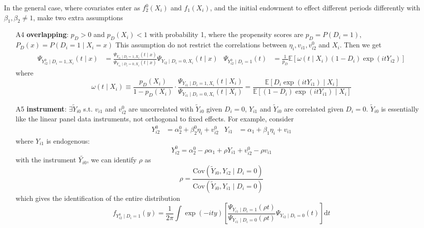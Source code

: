 \documentclass[twoside]{article}
\begin{document}
In the general case, where covariates enter as $f_2^0(X_i)$ and $f_1(X_i)$, and the initial endowment to effect different periods differently with $\beta_1,\beta_2\neq 1$, \citet{bonhomme2011recover} make two extra assumptions
\begin{itemize}
    \item[A4] \textbf{overlapping}: $p_D>0$ and $p_D(X_i)<1$ with probability 1, where the propensity scores are $p_D=P(D_i=1)$, $P_D(x)=P\left(D_i=1\mid X_i=x\right)$
        This assumption do not restrict the correlations between $\eta_i,v_{i1},v^0_{i2}$ and $X_i$. Then we get 
    \begin{align*}
        \Psi_{Y^0_{i2}\mid D_i=1,X_i}(t\mid x) &= \frac{\Psi_{Y_{i1}\mid D_i=1,X_i}(t\mid x)}{ \Psi_{Y_{i1}\mid D_i=0,X_i}(t\mid x) } \Psi_{Y_{i2}\mid D_i=0,X_i}(t\mid x) & \Psi_{Y^0_{i2}\mid D_i=1}(t) &= \frac{1}{p_D}\mathbb{E}\left[ \omega (t\mid X_i)(1-D_i)\exp(itY_{i2}) \right]
    \end{align*}
    where
    \begin{equation*}
        \omega(t\mid X_i) \equiv \frac{p_D(X_i)}{1-p_D(X_i)} \cdot \frac{\Psi_{Y_{i1}\mid D_i=1,X_i}(t\mid X_i)}{\Psi_{Y_{i1}\mid D_i=0,X_i}(t\mid X_i)} = \frac{\mathbb{E} \left[D_i\exp(itY_{i1})\mid X_i\right]}{ \mathbb{E}\left[(1-D_i)\exp(itY_{i1})\mid X_i\right] }
    \end{equation*}
    \item[A5] \textbf{instrument}: $\exists \tilde{Y}_{i0}$ s.t. $v_{i1}$ and $v_{i2}^0$ are uncorrelated with $\tilde{Y}_{i0}$ given $D_i=0$, $Y_{i1}$ and $\tilde{Y}_{i0}$ are correlated given $D_i=0$. $\tilde{Y}_{i0}$ is essentially like the linear panel data instruments, not orthogonal to fixed effects. 
    For example, consider 
    \begin{align*}
        Y^0_{i2} &= \alpha^0_2 + \beta^0_2\eta_i + v_{i2}^0 & Y_{i1} &= \alpha_1 + \beta_1\eta_i + v_{i1}
    \end{align*}
    where $Y_{i1}$ is endogenous: $$ Y_{i2}^0 = \alpha^0_2 - \rho\alpha_1 + \rho Y_{i1} + v^0_{i2}- \rho v_{i1}$$
    with the instrument $\tilde{Y_{i0}}$, we can identify $\rho$ as $$ \rho = \frac{\mathrm{Cov}\left(\tilde{Y}_{i0},Y_{i2}\mid D_i=0\right)}{\mathrm{Cov}\left(\tilde{Y}_{i0},Y_{i1}\mid D_i=0\right)} $$
    which gives the identification of the entire distribution 
    \begin{equation*}
        f_{Y^0_{i2}\mid D_i=1}(y) = \frac{1}{2\pi} \int \exp\left(-ity\right) \left[\frac{\Psi_{Y_{i1}\mid D_i=1}(\rho t)}{\Psi_{Y_{i1}\mid D_i=0} (\rho t)} \Psi_{Y_{i2}\mid D_i=0}(t) \right]\mathrm{d}t
    \end{equation*}
\end{itemize}
\end{document}
